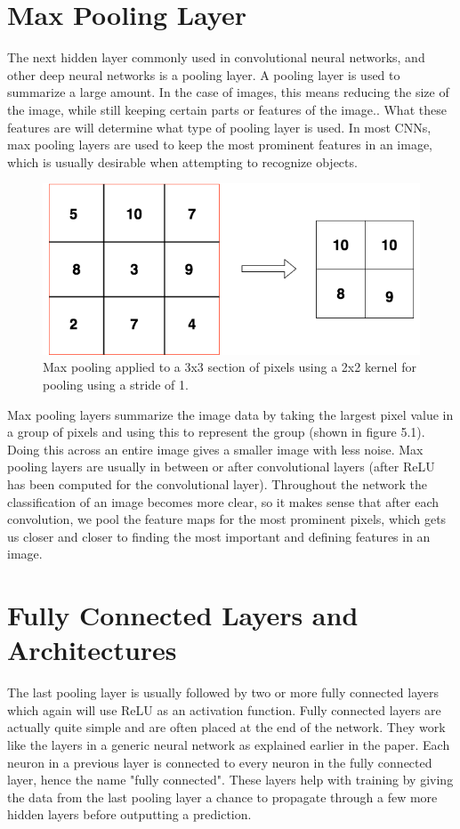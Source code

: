 \documentclass[12pt]{report} %
\begin{document}
 \section{Max Pooling Layer}

	The next hidden layer commonly used in convolutional neural networks, and other deep neural networks is a pooling layer. A pooling layer is used to summarize a large amount. In the case of images, this means reducing the size of the image, while still keeping certain parts or features of the image.\cite{aurelienMachineLearning}. What these features are will determine what type of pooling layer is used. In most CNNs, max pooling layers are used to keep the most prominent features in an image, which is usually desirable when attempting to recognize objects. 
\begin{figure}
\centering
\includegraphics[width=7in]{max_pooling}
\caption{Max pooling applied to a 3x3 section of pixels using a 2x2 kernel for pooling using a stride of 1.}
\end{figure}		
	Max pooling layers summarize the image data by taking the largest pixel value in a group of pixels and using this to represent the group (shown in figure 5.1). Doing this across an entire image gives a smaller image with less noise. Max pooling layers are usually in between or after convolutional layers (after ReLU has been computed for the convolutional layer). Throughout the network the classification of an image becomes more clear, so it makes sense that after each convolution, we pool the feature maps for the most prominent pixels, which gets us closer and closer to finding the most important and defining features in an image. 

 \section{Fully Connected Layers and Architectures}
	
	The last pooling layer is usually followed by two or more fully connected layers which again will use ReLU as an activation function. Fully connected layers are actually quite simple and are often placed at the end of the network. They work like the layers in a generic neural network as explained earlier in the paper. Each neuron in a previous layer is connected to every neuron in the fully connected layer, hence the name "fully connected"\cite{LeonardoFully}. These layers help with training by giving the data from the last pooling layer a chance to propagate through a few more hidden layers before outputting a prediction. 
	
\end{document}
